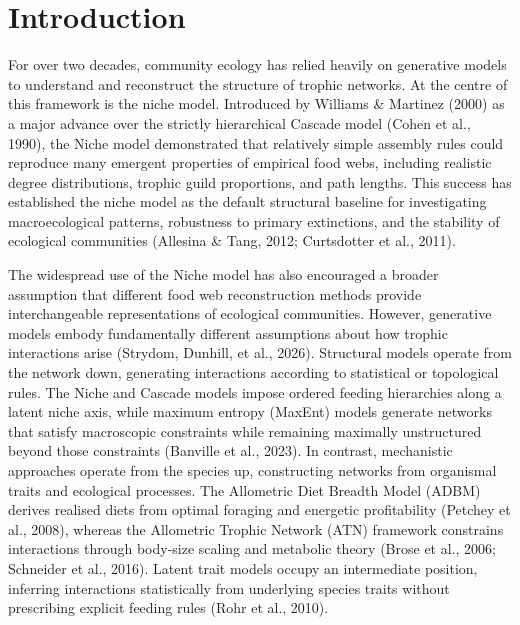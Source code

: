 \documentclass[
]{article}
\begin{document}
\newpage


\linenumbers
\doublespacing %

\makeatletter
{}%
\makeatother

\section{Introduction}\label{introduction}

For over two decades, community ecology has relied heavily on generative
models to understand and reconstruct the structure of trophic networks.
At the centre of this framework is the niche model. Introduced by
Williams \& Martinez (2000) as a major advance over the strictly
hierarchical Cascade model (Cohen et al., 1990), the Niche model
demonstrated that relatively simple assembly rules could reproduce many
emergent properties of empirical food webs, including realistic degree
distributions, trophic guild proportions, and path lengths. This success
has established the niche model as the default structural baseline for
investigating macroecological patterns, robustness to primary
extinctions, and the stability of ecological communities (Allesina \&
Tang, 2012; Curtsdotter et al., 2011).

The widespread use of the Niche model has also encouraged a broader
assumption that different food web reconstruction methods provide
interchangeable representations of ecological communities. However,
generative models embody fundamentally different assumptions about how
trophic interactions arise (Strydom, Dunhill, et al., 2026). Structural
models operate from the network down, generating interactions according
to statistical or topological rules. The Niche and Cascade models impose
ordered feeding hierarchies along a latent niche axis, while maximum
entropy (MaxEnt) models generate networks that satisfy macroscopic
constraints while remaining maximally unstructured beyond those
constraints (Banville et al., 2023). In contrast, mechanistic approaches
operate from the species up, constructing networks from organismal
traits and ecological processes. The Allometric Diet Breadth Model
(ADBM) derives realised diets from optimal foraging and energetic
profitability (Petchey et al., 2008), whereas the Allometric Trophic
Network (ATN) framework constrains interactions through body-size
scaling and metabolic theory (Brose et al., 2006; Schneider et al.,
2016). Latent trait models occupy an intermediate position, inferring
interactions statistically from underlying species traits without
prescribing explicit feeding rules (Rohr et al., 2010).
\end{document}
